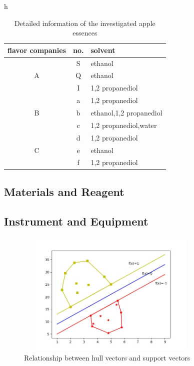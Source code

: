 \documentclass[a4paper]{article}
\begin{document}
\begin{table}{h} %
  \centering
  \caption{Detailed information of the investigated apple essences}\label{a}
  \begin{tabular}{c|c|l}

     \hline
     flavor companies       & no.       & solvent \\
     \hline
     \multirow{3}{*}{A}       & S         & ethanol \\
     \cline{2-3}
                              & Q         & ethanol \\
     \cline{2-3}
                              & I         & 1,2 propanediol \\
     \hline
     \multirow{3}{*}{B}       & a         & 1,2 propanediol \\
     \cline{2-3}
                              & b         & ethanol,1,2 propanediol \\
     \cline{2-3}
                              & c         & 1,2 propanediol,water \\
     \hline
     \multirow{3}{*}{C}       & d         & 1,2 propanediol \\
     \cline{2-3}
                              & e         & ethanol \\
     \cline{2-3}
                              & f         & 1,2 propanediol \\
     \hline
   \end{tabular}

\end{table}



\subsection{Materials and Reagent}

\subsection{Instrument and Equipment}



\begin{figure}[h]
  \centering
  \includegraphics[width=9cm,height=6cm]{HullVector_SupportVector}
  \caption{Relationship between hull vectors and support vectors}
\end{figure}
\end{document}
